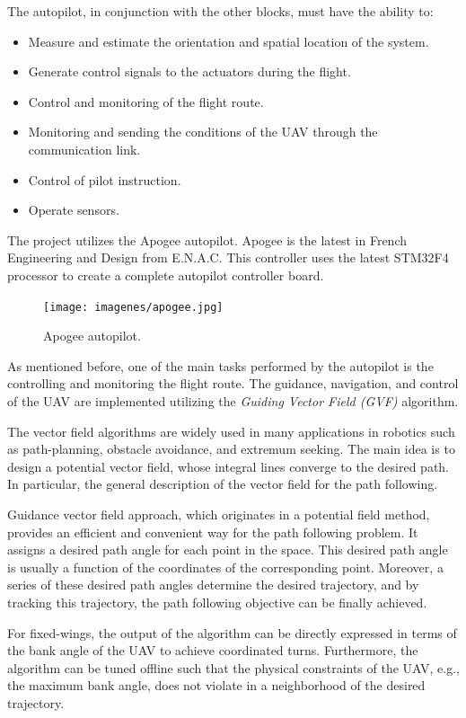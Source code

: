 The autopilot, in conjunction with the other blocks, must have the ability to:
\begin{itemize}
    \item Measure and estimate the orientation and spatial location of the system.
    \item Generate control signals to the actuators during the flight.
    \item Control and monitoring of the flight route.
    \item Monitoring and sending the conditions of the UAV through the communication link.
    \item Control of pilot instruction.
    \item Operate sensors.
\end{itemize}

The project utilizes the Apogee autopilot. Apogee is the latest in French Engineering and Design from E.N.A.C.  This controller uses the latest STM32F4 processor to create a complete autopilot controller board. \cite{apogee}
\begin{figure}[H]
\centering
\texttt{[image: imagenes/apogee.jpg]}
\caption{Apogee autopilot.}
\label{fig:apogee}
\end{figure}
As mentioned before, one of the main tasks performed by the autopilot is the controlling and monitoring the flight route. The guidance, navigation, and control of the UAV are implemented utilizing the \textit{Guiding Vector Field (GVF)} algorithm. 

The vector field algorithms are widely used in many applications in robotics such as path-planning, obstacle avoidance, and extremum seeking. The main idea is to design a potential vector field, whose integral lines converge to the desired path. In particular, the general description of the vector field for the path following.\cite{GVF}

Guidance vector field approach, which originates in a potential field method, provides an efficient and convenient way for the path following problem. It assigns a desired path angle for each point in the space. This desired path angle is usually a function of the coordinates of the corresponding point. Moreover, a series of these desired path angles determine the desired trajectory, and by tracking this trajectory, the path following objective can be finally achieved.\cite{7170894}

For fixed-wings, the output of the algorithm can be directly expressed in terms of the bank angle of the UAV to achieve coordinated turns. Furthermore, the algorithm can be tuned offline such that the physical constraints of the UAV, e.g., the maximum bank angle, does not violate in a neighborhood of the desired trajectory.\cite{7942030}


